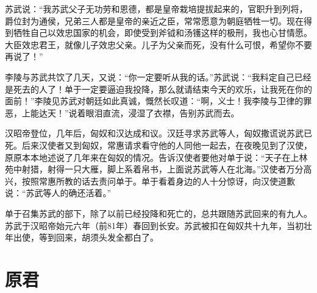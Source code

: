 \documentclass[12pt,UTF-8,openany,a4]{ctexbook}
\begin{document}
\begin{large}
    苏武说：“我苏武父子无功劳和恩德，都是皇帝栽培提拔起来的，官职升到列将，爵位封为通侯，兄弟三人都是皇帝的亲近之臣，常常愿意为朝庭牺牲一切。现在得到牺牲自己以效忠国家的机会，即使受到斧钺和汤镬这样的极刑，我也心甘情愿。大臣效忠君王，就像儿子效忠父亲。儿子为父亲而死，没有什么可恨，希望你不要再说了！”
    
    李陵与苏武共饮了几天，又说：“你一定要听从我的话。”苏武说：“我料定自己已经是死去的人了！单于一定要逼迫我投降，那么就请结束今天的欢乐，让我死在你的面前！”李陵见苏武对朝廷如此真诚，慨然长叹道：“啊，义士！我李陵与卫律的罪恶，上能达天！”说着眼泪直流，浸湿了衣襟，告别苏武而去。
    
    汉昭帝登位，几年后，匈奴和汉达成和议。汉廷寻求苏武等人，匈奴撒谎说苏武已死。后来汉使者又到匈奴，常惠请求看守他的人同他一起去，在夜晚见到了汉使，原原本本地述说了几年来在匈奴的情况。告诉汉使者要他对单于说：“天子在上林苑中射猎，射得一只大雁，脚上系着帛书，上面说苏武等人在北海。”汉使者万分高兴，按照常惠所教的话去责问单于。单于看着身边的人十分惊讶，向汉使道歉说：“苏武等人的确还活着。”
    
    单于召集苏武的部下，除了以前已经投降和死亡的，总共跟随苏武回来的有九人。苏武于汉昭帝始元六年（前81年）春回到长安。苏武被扣在匈奴共十九年，当初壮年出使，等到回来，胡须头发全都白了。
    
\end{large}



\chapter{原君}
\end{document}
